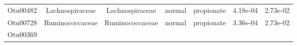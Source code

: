 \documentclass[11pt,]{article}
\begin{document}
\begin{longtable}[]{@{}ccccccc@{}}
\begin{minipage}[t]{0.09\columnwidth}\centering\strut
Otu00482\strut
\end{minipage} & \begin{minipage}[t]{0.17\columnwidth}\centering\strut
Lachnospiraceae\strut
\end{minipage} & \begin{minipage}[t]{0.17\columnwidth}\centering\strut
Lachnospiraceae\strut
\end{minipage} & \begin{minipage}[t]{0.09\columnwidth}\centering\strut
normal\strut
\end{minipage} & \begin{minipage}[t]{0.11\columnwidth}\centering\strut
propionate\strut
\end{minipage} & \begin{minipage}[t]{0.09\columnwidth}\centering\strut
4.18e-04\strut
\end{minipage} & \begin{minipage}[t]{0.09\columnwidth}\centering\strut
2.73e-02\strut
\end{minipage}\tabularnewline
\begin{minipage}[t]{0.09\columnwidth}\centering\strut
Otu00728\strut
\end{minipage} & \begin{minipage}[t]{0.17\columnwidth}\centering\strut
Ruminococcaceae\strut
\end{minipage} & \begin{minipage}[t]{0.17\columnwidth}\centering\strut
Ruminococcaceae\strut
\end{minipage} & \begin{minipage}[t]{0.09\columnwidth}\centering\strut
normal\strut
\end{minipage} & \begin{minipage}[t]{0.11\columnwidth}\centering\strut
propionate\strut
\end{minipage} & \begin{minipage}[t]{0.09\columnwidth}\centering\strut
3.36e-04\strut
\end{minipage} & \begin{minipage}[t]{0.09\columnwidth}\centering\strut
2.73e-02\strut
\end{minipage}\tabularnewline
\begin{minipage}[t]{0.09\columnwidth}\centering\strut
Otu00369\strut
\end{minipage} & \begin{minipage}[t]{0.17\columnwidth}\centering\strut

\end{minipage}
\end{longtable}
\end{document}
